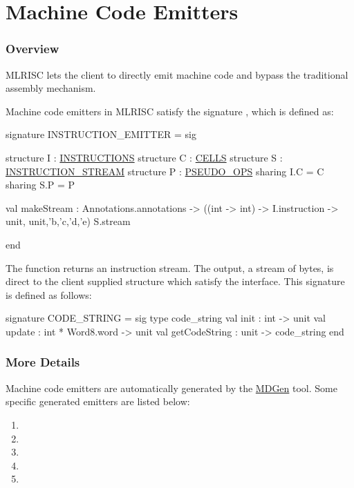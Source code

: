 \section{Machine Code Emitters}

\subsubsection{Overview}
MLRISC lets the client to directly emit machine code and bypass the traditional
assembly mechanism. 

Machine code emitters in MLRISC satisfy the signature 
,
which is defined as:
\begin{SML}
signature INSTRUCTION_EMITTER =
sig

   structure I : \href{instructions.html}{INSTRUCTIONS}
   structure C : \href{cells.html}{CELLS}
   structure S : \href{streams.html}{INSTRUCTION_STREAM}
   structure P : \href{pseudo-ops.html}{PSEUDO_OPS}
      sharing I.C = C  
      sharing S.P = P

   val makeStream : Annotations.annotations ->
                     ((int -> int) -> I.instruction -> unit,
                      unit,'b,'c,'d,'e) S.stream

end
\end{SML}

The function  returns an instruction stream.
The output, a stream of bytes, is direct to the client supplied
structure which satisfy the 
 interface.
This signature is defined as follows:
\begin{SML}
signature CODE_STRING = sig
  type code_string
  val init          : int -> unit
  val update        : int * Word8.word -> unit
  val getCodeString : unit -> code_string
end
\end{SML}

\subsubsection{More Details}

Machine code emitters are automatically generated by the 
\href{mlrisc-md.html}{MDGen} tool.  Some specific generated
emitters are listed below:
\begin{enumerate}
 \item {}
 \item {}
 \item {}
 \item {}
 \item {}
\end{enumerate}

